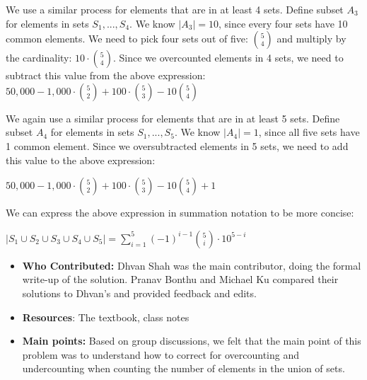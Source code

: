 \documentclass[11pt]{article}
\begin{document}
We use a similar process for elements that are in at least 4 sets. Define subset $A_3$ for elements in sets $S_1, ..., S_4$. We know $|A_3|=10$, since every four sets have 10 common elements. We need to pick four sets out of five: $\binom{5}{4}$ and multiply by the cardinality: $10 \cdot \binom{5}{4}$. Since we overcounted elements in 4 sets, we need to subtract this value from the above expression: $50,000 - 1,000 \cdot \binom{5}{2} + 100 \cdot \binom{5}{3} - 10 \binom{5}{4}$

We again use a similar process for elements that are in at least 5 sets. Define subset $A_4$ for elements in sets $S_1, ..., S_5$. We know $|A_4|=1$, since all five sets have 1 common element. Since we oversubtracted elements in 5 sets, we need to add this value to the above expression:

$50,000 - 1,000 \cdot \binom{5}{2} + 100 \cdot \binom{5}{3} - 10 \binom{5}{4} + 1$

We can express the above expression in summation notation to be more concise:

$|S_1 \cup S_2 \cup S_3 \cup S_4 \cup S_5| = \sum_{i=1}^{5}(-1)^{i-1} \binom{5}{i} \cdot 10^{5 - i}$

\begin{itemize}
    \item \textbf{Who Contributed:} Dhvan Shah was the main contributor, doing the formal write-up of the solution. Pranav Bonthu and Michael Ku compared their solutions to Dhvan's and provided feedback and edits.
    \item \textbf{Resources}: The textbook, class notes
    \item \textbf{Main points:} Based on group discussions, we felt that the main point of this problem was to understand how to correct for overcounting and undercounting when counting the number of elements in the union of sets.
\end{itemize}
\end{document}
